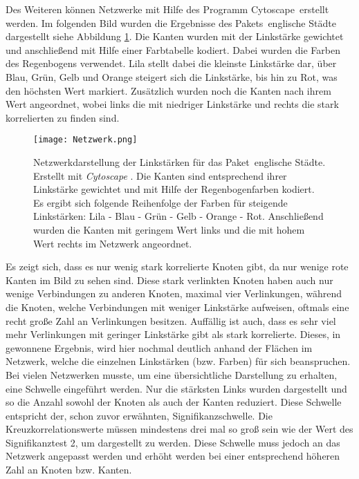 \documentclass[fontsize=11pt, twoside, a4paper]{scrartcl}
\begin{document}
Des Weiteren können Netzwerke mit Hilfe des Programm \glqq Cytoscape\grqq \, \cite{Cytoscape} erstellt werden. Im folgenden Bild wurden die Ergebnisse des Pakets \,\glqq englische Städte\grqq\, dargestellt siehe Abbildung \ref{Netzwerk}. Die Kanten wurden mit der Linkstärke gewichtet und anschließend mit Hilfe einer Farbtabelle kodiert. Dabei wurden die Farben des Regenbogens verwendet. Lila stellt dabei die kleinste Linkstärke dar, über Blau, Grün, Gelb und Orange steigert sich die Linkstärke, bis hin zu Rot, was den höchsten Wert markiert. Zusätzlich wurden noch die Kanten nach ihrem Wert angeordnet, wobei links die mit niedriger Linkstärke und rechts die stark korrelierten zu finden sind. 
\begin{figure}[H]
	\centering
	\texttt{[image: Netzwerk.png]}
	
	\caption{Netzwerkdarstellung der Linkstärken für das Paket \,\glqq englische Städte\grqq. Erstellt mit \textit{Cytoscape} \cite{Cytoscape}. Die Kanten sind entsprechend ihrer Linkstärke gewichtet und mit Hilfe der Regenbogenfarben kodiert. Es ergibt sich folgende Reihenfolge der Farben für steigende Linkstärken: Lila - Blau - Grün - Gelb - Orange - Rot. Anschließend wurden die Kanten mit geringem Wert links und die mit hohem Wert rechts im Netzwerk angeordnet.}
	\label{Netzwerk}
\end{figure}
Es zeigt sich, dass es nur wenig stark korrelierte Knoten gibt, da nur wenige rote Kanten im Bild zu sehen sind. Diese stark verlinkten Knoten haben auch nur wenige Verbindungen zu anderen Knoten, maximal vier Verlinkungen, während die Knoten, welche Verbindungen mit weniger Linkstärke aufweisen, oftmals eine recht große Zahl an Verlinkungen besitzen. Auffällig ist auch, dass es sehr viel mehr Verlinkungen mit geringer Linkstärke gibt als stark korrelierte. Dieses, in  gewonnene Ergebnis, wird hier nochmal deutlich anhand der Flächen im Netzwerk, welche die einzelnen Linkstärken (bzw. Farben) für sich beanspruchen.\\
Bei vielen Netzwerken musste, um eine übersichtliche Darstellung zu erhalten, eine Schwelle eingeführt werden. Nur die stärksten Links wurden dargestellt und so die Anzahl sowohl der Knoten als auch der Kanten reduziert. Diese Schwelle entspricht der, schon zuvor erwähnten, Signifikanzschwelle. Die Kreuzkorrelationswerte müssen mindestens drei mal so groß sein wie der Wert des Signifikanztest 2, um dargestellt zu werden. Diese Schwelle muss jedoch an das Netzwerk angepasst werden und erhöht werden bei einer entsprechend höheren Zahl an Knoten bzw. Kanten.
\end{document}
